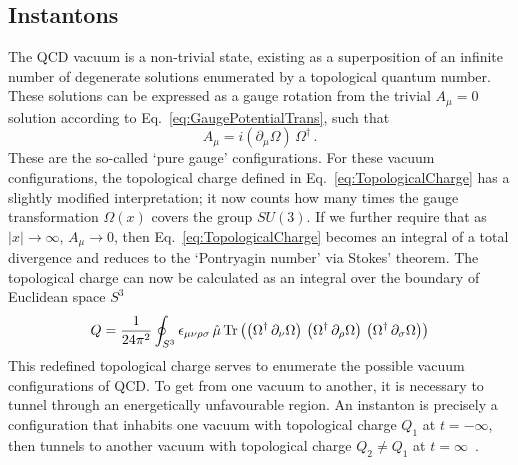 \subsection{Instantons}\label{sec:Instantons}
The QCD vacuum is a non-trivial state, existing as a superposition of an infinite number of degenerate solutions enumerated by a topological quantum number. These solutions can be expressed as a gauge rotation from the trivial $A_\mu=0$ solution according to Eq.~\ref{eq:GaugePotentialTrans}, such that
%
\begin{equation}
A_\mu = i(\partial_\mu \Omega)\,\Omega^\dagger\, .
\end{equation}
%
These are the so-called `pure gauge' configurations. For these vacuum configurations, the topological charge defined in Eq.~\ref{eq:TopologicalCharge} has a slightly modified interpretation; it now counts how many times the gauge transformation $\Omega(x)$ covers the group $SU(3)$. If we further require that as $|x|\rightarrow \infty$, $A_\mu\rightarrow 0$, then  Eq.~\ref{eq:TopologicalCharge} becomes an integral of a total divergence and reduces to the `Pontryagin number' via Stokes' theorem. The topological charge can now be calculated as an integral over the boundary of Euclidean space $S^3$~\cite{ryder1996quantum}
%
\begin{equation}
Q = \frac{1}{24\pi^2}\oint_{S^3} \epsilon_{\mu\nu\rho\sigma} \, \hat{\mu}\operatorname{Tr}\left(\left(\Omega^\dagger \,\partial_\nu \Omega\right)\,\left(\Omega^\dagger \,\partial_\rho \Omega\right)\,\left(\Omega^\dagger \,\partial_\sigma \Omega\right)\right)
\end{equation}
%
This redefined topological charge serves to enumerate the possible vacuum configurations of QCD. To get from one vacuum to another, it is necessary to tunnel through an energetically unfavourable region. An instanton is precisely a configuration that inhabits one vacuum with topological charge $Q_1$ at $t=-\infty$, then tunnels to another vacuum with topological charge $Q_2\neq Q_1$ at $t=\infty$~\cite{Schafer:1996wv}.\\

